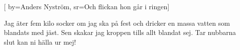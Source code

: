 


[ 	%
	by={Anders Nyström},	%
	sr={Och flickan hon går i ringen}]		%
	
\beginverse*		%
Jag äter fem kilo socker om jag ska på fest
och dricker en massa vatten som blandats med jäst.
Sen skakar jag kroppen tills allt blandat sej.
Tar nubbarna slut kan ni hälla ur mej!
\endverse			%

\endsong			%
